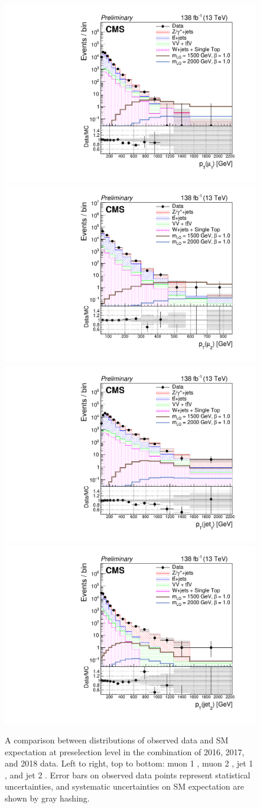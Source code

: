 \begin{figure}[H]
       \centering
       {\includegraphics[width=.49\textwidth]{Images/Analysis/Results_combined_Unblinded/Plots/Preselection/BasicLQ_uujj_Pt_muon1_standard.pdf}}
       {\includegraphics[width=.49\textwidth]{Images/Analysis/Results_combined_Unblinded/Plots/Preselection/BasicLQ_uujj_Pt_muon2_standard.pdf}}
       {\includegraphics[width=.49\textwidth]{Images/Analysis/Results_combined_Unblinded/Plots/Preselection/BasicLQ_uujj_Pt_jet1_standard.pdf}}
       {\includegraphics[width=.49\textwidth]{Images/Analysis/Results_combined_Unblinded/Plots/Preselection/BasicLQ_uujj_Pt_jet2_standard.pdf}}
       \caption{A comparison between distributions of observed data and SM expectation at preselection level in the combination of 2016, 2017, and 2018 data. Left to right, top to bottom: muon 1 \pt, muon 2 \pt, jet 1 \pt, and jet 2 \pt. Error bars on observed data points represent statistical uncertainties, and systematic uncertainties on SM expectation are shown by gray hashing.}
	\label{figa:preselptCombined}
\end{figure}

